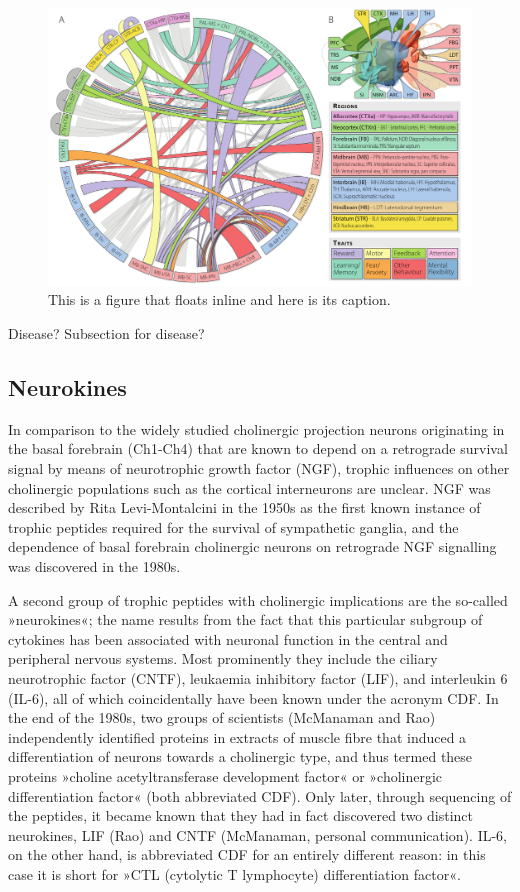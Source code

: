 \begin{figure}
\includegraphics[width=\textwidth]{figures/projections}
\caption[Short figure name.]{This is a figure that floats inline and here is its caption.
\label{fig:cholinergicProjections}}
\end{figure}

Disease? Subsection for disease?

\subsection{Neurokines}
In comparison to the widely studied cholinergic projection neurons originating in the basal forebrain (Ch1-Ch4) that are known to depend on a retrograde survival signal by means of neurotrophic growth factor (NGF), trophic influences on other cholinergic populations such as the cortical interneurons are unclear.  NGF was described by Rita Levi-Montalcini in the 1950s as the first known instance of trophic peptides required for the survival of sympathetic ganglia\cite{Levi-Montalcini1960}, and the dependence of basal forebrain cholinergic neurons on retrograde NGF signalling was discovered in the 1980s\cite{Hefti1986}.

A second group of trophic peptides with cholinergic implications are the so-called »neurokines«; the name results from the fact that this particular subgroup of cytokines has been associated with neuronal function in the central and peripheral nervous systems. Most prominently they include the ciliary neurotrophic factor (CNTF), leukaemia inhibitory factor (LIF), and interleukin 6 (IL-6), all of which coincidentally have been known under the acronym CDF. In the end of the 1980s, two groups of scientists (McManaman\cite{McManaman1988} and Rao\cite{Rao1992}) independently identified proteins in extracts of muscle fibre that induced a differentiation of neurons towards a cholinergic type, and thus termed these proteins »choline acetyltransferase development factor« or »cholinergic differentiation factor« (both abbreviated CDF). Only later, through sequencing of the peptides, it became known that they had in fact discovered two distinct neurokines, LIF (Rao) and CNTF (McManaman, personal communication). IL-6, on the other hand, is abbreviated CDF for an entirely different reason: in this case it is short for »CTL (cytolytic T lymphocyte) differentiation factor«.


